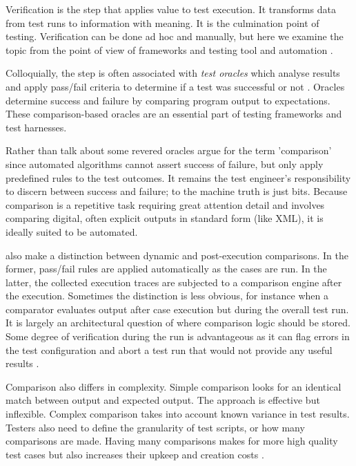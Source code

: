 \documentclass[12pt,a4paper,oneside,pdftex]{report}
\begin{document}
Verification is the step that applies value to test execution. It transforms data from test runs to information with meaning. It is the culmination point of testing. Verification can be done ad hoc and manually, but here we examine the topic from the point of view of frameworks and testing tool and automation \citep{fewster1999software}.

Colloquially, the step is often associated with \emph{test oracles} which analyse results and apply pass/fail criteria to determine if a test was successful or not \citep{pezze2008software, burnstein2003practical}. Oracles determine success and failure by comparing program output to expectations. These comparison-based oracles are an essential part of testing frameworks and test harnesses. \citep{pezze2008software}

Rather than talk about some revered oracles \citet{fewster1999software} argue for the term 'comparison' since automated algorithms cannot assert success of failure, but only apply predefined rules to the test outcomes. It remains the test engineer's responsibility to discern between success and failure; to the machine truth is just bits. Because comparison is a repetitive task requiring great attention detail and involves comparing digital, often explicit outputs in standard form (like XML), it is ideally suited to be automated. \citep{fewster1999software}

\citet{fewster1999software} also make a distinction between dynamic and post-execution comparisons. In the former, pass/fail rules are applied automatically as the cases are run. In the latter, the collected execution traces are subjected to a comparison engine after the execution. Sometimes the distinction is less obvious, for instance when a comparator evaluates output after case execution but during the overall test run. It is largely an architectural question of where comparison logic should be stored. Some degree of verification during the run is advantageous as it can flag errors in the test configuration and abort a test run that would not provide any useful results \citep{fewster1999software}.

Comparison also differs in complexity. Simple comparison looks for an identical match between output and expected output. The approach is effective but inflexible. Complex comparison takes into account known variance in test results. Testers also need to define the granularity of test scripts, or how many comparisons are made. Having many comparisons makes for more high quality test cases but also increases their upkeep and creation costs \citep{fewster1999software}. 
\end{document}
